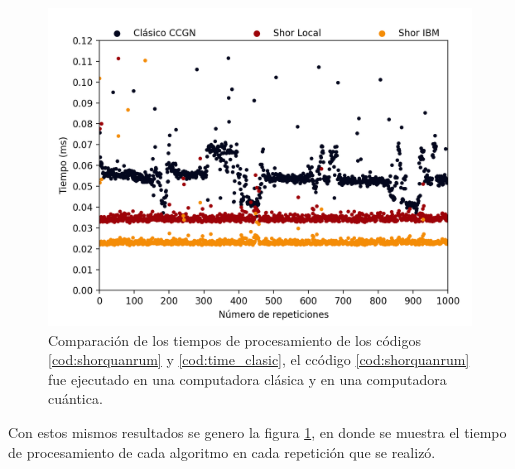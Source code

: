 \begin{figure}[H]
    \centering
    \includegraphics[scale=0.7]{images/time.png}
    \caption{Comparación de los tiempos de procesamiento de los códigos \ref{cod:shorquanrum} y \ref{cod:time_clasic}, el ccódigo \ref{cod:shorquanrum} fue 
    ejecutado en una computadora clásica y en una computadora cuántica.}
    \label{fig:time}
\end{figure}
Con estos mismos resultados se genero la figura \ref{fig:time}, en donde se muestra el tiempo de procesamiento de cada algoritmo en cada repetición que se realizó.